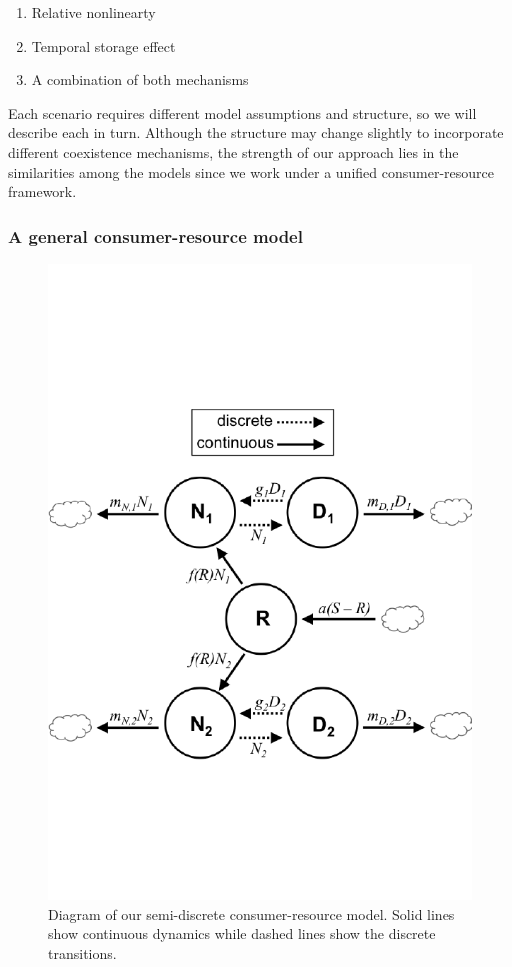\documentclass[12pt,]{article}
\begin{document}
\begin{enumerate}
  \item Relative nonlinearty
  \item Temporal storage effect
  \item A combination of both mechanisms
\end{enumerate}

Each scenario requires different model assumptions and structure, so we
will describe each in turn. Although the structure may change slightly
to incorporate different coexistence mechanisms, the strength of our
approach lies in the similarities among the models since we work under a
unified consumer-resource framework.

\subsubsection{A general consumer-resource
model}\label{a-general-consumer-resource-model}

\begin{figure}[htbp]
\centering
\includegraphics{components/figure/manuscript-figure_1.pdf}
\caption{Diagram of our semi-discrete consumer-resource model. Solid
lines show continuous dynamics while dashed lines show the discrete
transitions.}
\end{figure}
\end{document}
